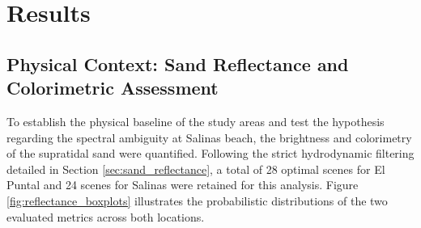 ﻿\documentclass[ENG]{TFUOC}%
\begin{document}
\begin{table}[H]
    \centering
    \caption{Summary of the evaluated extraction methods, their configurations, and the corresponding applied evaluation protocols.}
    \vspace{0.1cm}
    \renewcommand{\arraystretch}{1.4}
    \label{tab:evaluation_recap}
\end{table}


\chapter{Results}

\section{Physical Context: Sand Reflectance and Colorimetric Assessment}
\label{sec:results_sand_reflectance}

To establish the physical baseline of the study areas and test the hypothesis regarding the spectral ambiguity at Salinas beach, the brightness and colorimetry of the supratidal sand were quantified. Following the strict hydrodynamic filtering detailed in Section \ref{sec:sand_reflectance}, a total of 28 optimal scenes for El Puntal and 24 scenes for Salinas were retained for this analysis. Figure \ref{fig:reflectance_boxplots} illustrates the probabilistic distributions of the two evaluated metrics across both locations.
\end{document}
